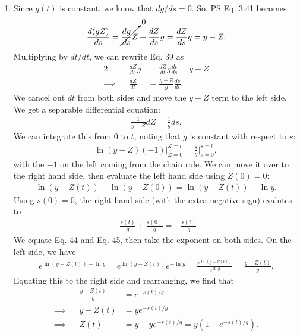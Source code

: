 \documentclass[11pt,letterpaper]{article}
\begin{document}
\begin{enumerate}[label=(\roman*)]
\item Since $g(t)$ is constant, we know that $dg/ds = 0$. So, PS Eq. 3.41 becomes 
    \begin{align}
        \frac{d(gZ)}{ds} = \cancelto{0}{\frac{dg}{ds}Z} + \frac{dZ}{ds}g = \frac{dZ}{ds}g = y-Z.
    \end{align}
    Multiplying by $dt/dt$, we can rewrite Eq. 39 as 
    \begin{alignat}{2}
        &&\frac{dZ}{ds}g &= \frac{dZ}{dt}g\frac{dt}{ds} = y-Z \\
        \implies&&\frac{dZ}{dt} &= \frac{y-Z}{g}\frac{ds}{dt}.
    \end{alignat}
    We cancel out $dt$ from both sides and move the $y-Z$ term to the left side. We get a separable differential equation:
    \begin{align}
        \frac{1}{y-Z}dZ = \frac{1}{g}ds.
    \end{align}
    We can integrate this from $0$ to $t$, noting that $g$ is constant with respect to $s$:
    \begin{align}
        \ln{(y-Z)}(-1)\big|^{Z=t}_{Z=0} = \frac{s}{g}\big|^{s=t}_{s=0},
    \end{align}
    with the $-1$ on the left coming from the chain rule. We can move it over to the right hand side, then evaluate the left hand side using $Z(0) = 0$:
    \begin{align}
        \ln{(y-Z(t))} - \ln{(y-Z(0))} = \ln{(y-Z(t))} - \ln{y}.
    \end{align}
    Using $s(0) = 0$, the right hand side (with the extra negative sign) evalutes to 
    \begin{align}
        -\frac{s(t)}{g} + \frac{s(0)}{g} = -\frac{s(t)}{g}.
    \end{align}
    We equate Eq. 44 and Eq. 45, then take the exponent on both sides. On the left side, we have 
    \begin{align}
        e^{\ln{(y-Z(t))} - \ln{y}} = e^{\ln{(y-Z(t))}} e^{-\ln{y}} = \frac{e^{\ln{(y-Z(t))}}}{e^{\ln{y}}} = \frac{y-Z(t)}{y}.
    \end{align}
    Equating this to the right side and rearranging, we find that 
    \begin{align}
        &&\frac{y-Z(t)}{y} &= e^{-s(t)/g} \\
        \implies&&y-Z(t) &= ye^{-s(t)/g} \\
        \implies&&Z(t) &= y - ye^{-s(t)/g} = y(1 - e^{-s(t)/g}).
    \end{align}


\end{enumerate}
\end{document}
